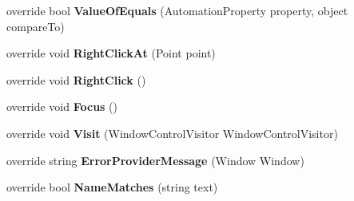 \begin{DoxyCompactItemize}
\item 
\hypertarget{class_proto_test_1_1_golem_1_1_white_1_1_elements_1_1_white_button_a006faff42cf6cba2368b913f26d4879d}{override bool {\bfseries Value\-Of\-Equals} (Automation\-Property property, object compare\-To)}\label{class_proto_test_1_1_golem_1_1_white_1_1_elements_1_1_white_button_a006faff42cf6cba2368b913f26d4879d}

\item 
\hypertarget{class_proto_test_1_1_golem_1_1_white_1_1_elements_1_1_white_button_a233843eb55edcd0bbb9e51c9f1a23426}{override void {\bfseries Right\-Click\-At} (Point point)}\label{class_proto_test_1_1_golem_1_1_white_1_1_elements_1_1_white_button_a233843eb55edcd0bbb9e51c9f1a23426}

\item 
\hypertarget{class_proto_test_1_1_golem_1_1_white_1_1_elements_1_1_white_button_a601b6f5e6b51bb9963012fab6012c582}{override void {\bfseries Right\-Click} ()}\label{class_proto_test_1_1_golem_1_1_white_1_1_elements_1_1_white_button_a601b6f5e6b51bb9963012fab6012c582}

\item 
\hypertarget{class_proto_test_1_1_golem_1_1_white_1_1_elements_1_1_white_button_a62d8367b6b184ab427ca012c53cb3ed1}{override void {\bfseries Focus} ()}\label{class_proto_test_1_1_golem_1_1_white_1_1_elements_1_1_white_button_a62d8367b6b184ab427ca012c53cb3ed1}

\item 
\hypertarget{class_proto_test_1_1_golem_1_1_white_1_1_elements_1_1_white_button_a480a6816493622ae798c674f4a51e9b9}{override void {\bfseries Visit} (Window\-Control\-Visitor Window\-Control\-Visitor)}\label{class_proto_test_1_1_golem_1_1_white_1_1_elements_1_1_white_button_a480a6816493622ae798c674f4a51e9b9}

\item 
\hypertarget{class_proto_test_1_1_golem_1_1_white_1_1_elements_1_1_white_button_ae843d91b13f0b077580b6bc7a35bf89e}{override string {\bfseries Error\-Provider\-Message} (Window Window)}\label{class_proto_test_1_1_golem_1_1_white_1_1_elements_1_1_white_button_ae843d91b13f0b077580b6bc7a35bf89e}

\item 
\hypertarget{class_proto_test_1_1_golem_1_1_white_1_1_elements_1_1_white_button_a3c0a7d65d53bfacc3d32c977f78ab179}{override bool {\bfseries Name\-Matches} (string text)}\label{class_proto_test_1_1_golem_1_1_white_1_1_elements_1_1_white_button_a3c0a7d65d53bfacc3d32c977f78ab179}


\end{DoxyCompactItemize}
